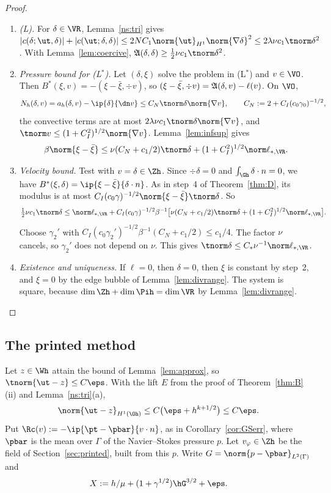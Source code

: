 \begin{proof}
\begin{enumerate}
\item \emph{(L).} For $\delta\in\VR$, Lemma~\ref{ns:tri} gives $|c(\delta;\ut,\delta)|+|c(\ut;\delta,\delta)|\le2NC_1\norm{\ut}_{H^1}\norm{\nabla\delta}^2\le2\lambda\nu c_1\tnorm\delta^2$. With Lemma~\ref{lem:coercive}, $\Aop(\delta,\delta)\ge\frac12\nu c_1\tnorm\delta^2$.
\item \emph{Pressure bound for (L$^\ast$).} Let $(\delta,\xi)$ solve the problem in (L$^\ast$) and $v\in\VO$. Then $B^\ast(\xi,v)=-(\xi-\bar\xi,\div v)$, so $(\xi-\bar\xi,\div v)=\mathfrak A(\delta,v)-\ell(v)$. On $\VO$,
\[
N_h(\delta,v)=a_h(\delta,v)-\ip{\delta}{\dn v}\le C_N\tnorm\delta\norm{\nabla v},\qquad C_N:=2+C_I(c_0\gamma_0)^{-1/2},
\]
the convective terms are at most $2\lambda\nu c_1\tnorm\delta\norm{\nabla v}$, and $\tnorm v\le(1+C_I^2)^{1/2}\norm{\nabla v}$. Lemma~\ref{lem:infsup} gives
\[
\beta\norm{\xi-\bar\xi}\le\nu(C_N+c_1/2)\tnorm\delta+(1+C_I^2)^{1/2}\norm\ell_{\ast,\VR}.
\]
\item \emph{Velocity bound.} Test with $v=\delta\in\Zh$. Since $\div\delta=0$ and $\int_{\Gh}\delta\cdot n=0$, we have $B^\ast(\xi,\delta)=\ip{\xi-\bar\xi}{\delta\cdot n}$. As in step~4 of Theorem~\ref{thm:D}, its modulus is at most $C_I(c_0\gamma)^{-1/2}\norm{\xi-\bar\xi}\tnorm\delta$. So
\[
\tfrac12\nu c_1\tnorm\delta\le\norm\ell_{\ast,\VR}+C_I(c_0\gamma)^{-1/2}\beta^{-1}\bigl[\nu(C_N+c_1/2)\tnorm\delta+(1+C_I^2)^{1/2}\norm\ell_{\ast,\VR}\bigr].
\]
Choose $\gamma_2'$ with $C_I(c_0\gamma_2')^{-1/2}\beta^{-1}(C_N+c_1/2)\le c_1/4$. The factor $\nu$ cancels, so $\gamma_2'$ does not depend on $\nu$. This gives $\tnorm\delta\le C_\ast\nu^{-1}\norm\ell_{\ast,\VR}$.
\item \emph{Existence and uniqueness.} If $\ell=0$, then $\delta=0$, then $\xi$ is constant by step~2, and $\xi=0$ by the edge bubble of Lemma~\ref{lem:divrange}. The system is square, because $\dim\Zh+\dim\Pih=\dim\VR$ by Lemma~\ref{lem:divrange}.\qedhere
\end{enumerate}
\end{proof}

\subsection{The printed method}
Let $z\in\Wh$ attain the bound of Lemma~\ref{lem:approx}, so $\tnorm{\ut-z}\le C\eps$. With the lift $E$ from the proof of Theorem~\ref{thm:B}(ii) and Lemma~\ref{ns:tri}(a),
\begin{equation}\label{ns:zH1}
\norm{\ut-z}_{H^1(\Oh)}\le C\bigl(\eps+h^{k+1/2}\bigr)\le C\eps .
\end{equation}
Put $\Rc(v):=-\ip{\pt-\pbar}{v\cdot n}$, as in Corollary~\ref{cor:GSerr}, where $\pbar$ is the mean over $\Gamma$ of the Navier--Stokes pressure $p$. Let $v_\varphi\in\Zh$ be the field of Section~\ref{sec:printed}, built from this $p$. Write $G=\norm{p-\pbar}_{L^2(\Gamma)}$ and
\[
X:=h/\mu+(1+\gamma^{1/2})\hG^{3/2}+\eps .
\]

